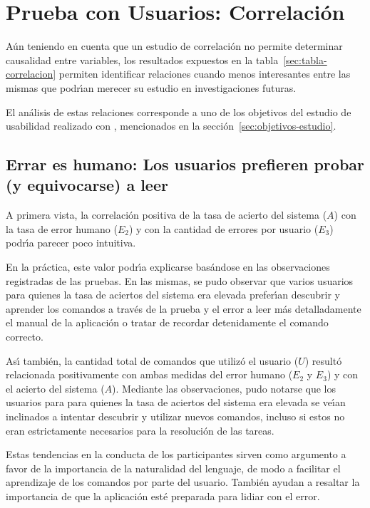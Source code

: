 \section{Prueba con Usuarios: Correlaci\'on}
A\'un teniendo en cuenta que un estudio de correlaci\'on no permite determinar causalidad
entre variables, los resultados expuestos en la tabla~\ref{sec:tabla-correlacion} 
permiten identificar relaciones cuando menos interesantes entre las mismas que podr{{\'\i}}an
merecer su estudio en investigaciones futuras.

El an\'alisis de estas relaciones corresponde a uno de los objetivos del estudio de usabilidad
realizado con , mencionados en la secci\'on~\ref{sec:objetivos-estudio}.

\subsection[Errar es humano: Los usuarios prefieren probar (y equivocarse) a leer]
{Errar es humano: Los usuarios prefieren probar \\ (y equivocarse) a leer}
A primera vista, la correlaci\'on positiva de la tasa de acierto del sistema ($A$) con la
tasa de error humano ($E_2$) y con la cantidad de errores por usuario ($E_3$) podr{{\'\i}}a parecer
poco intuitiva.

En la pr\'actica, este valor podr{{\'\i}}a explicarse bas\'andose en las observaciones registradas 
de las pruebas. En las mismas, se pudo observar que varios usuarios para quienes la tasa de
aciertos del sistema era elevada prefer{{\'\i}}an descubrir y aprender los comandos a trav\'es
de la prueba y el error a leer m\'as detalladamente el manual de la aplicaci\'on o tratar de
recordar detenidamente el comando correcto.

As{{\'\i}} tambi\'en, la cantidad total de comandos que utiliz\'o el usuario ($U$) result\'o relacionada
positivamente con ambas medidas del error humano ($E_2$ y $E_3$) y con el acierto del sistema ($A$). 
Mediante las observaciones, pudo notarse que los usuarios para para quienes la tasa de
aciertos del sistema era elevada se ve{{\'\i}}an inclinados a intentar descubrir y utilizar nuevos
comandos, incluso si estos no eran estrictamente necesarios para la resoluci\'on de las tareas.

Estas tendencias en la conducta de los participantes sirven como argumento a favor de la importancia 
de la naturalidad del lenguaje, de modo a facilitar el aprendizaje de los comandos por parte del usuario.
Tambi\'en ayudan a resaltar la importancia de que la aplicaci\'on est\'e preparada para lidiar con el error.

